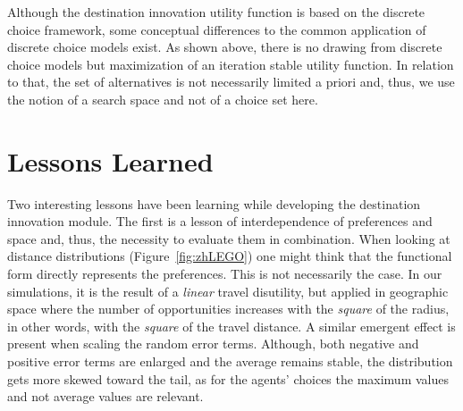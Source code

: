 
Although the destination innovation utility function is based on the discrete choice framework, some conceptual differences to the common application of discrete choice models exist. 
As shown above, there is no drawing from discrete choice models but maximization of an iteration stable utility function. 
In relation to that, the set of alternatives is not necessarily limited a priori and, thus, we use the notion of a search space and not of a choice set here.

\section{Lessons Learned}
Two interesting lessons have been learning while developing the destination innovation module. 
The first is a lesson of interdependence of preferences and space and,  thus, the necessity to evaluate them in combination. 
When looking at distance distributions (\eg Figure~\ref{fig:zhLEGO}) one might think that the functional form directly represents the preferences. 
This is not necessarily the case. 
In our simulations, it is the result of a \emph{linear} travel disutility, but applied in geographic space where the number of opportunities increases with the \emph{square} of the radius, in other words, with the \emph{square} of the travel distance. 
A similar emergent effect is present when scaling the random error terms. 
Although, both negative and positive error terms are enlarged and the average remains stable, the distribution gets more skewed toward the tail, as for the agents' choices the maximum values and not average values are relevant.

